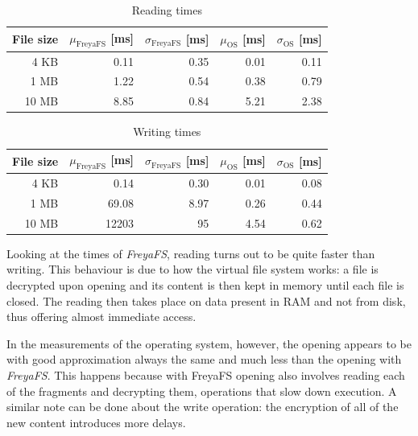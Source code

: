 \documentclass[a4paper,12pt,twoside,openright]{report}
\begin{document}
  \begin{table}[h!]
    \centering
    \begin{tabular}{|r||r|r||r|r|} 
      \hline
      File size & $\mu_\text{FreyaFS}$ [ms] & $\sigma_\text{FreyaFS}$ [ms] & $\mu_\text{OS}$ [ms] & $\sigma_\text{OS}$ [ms] \\ [0.5ex]
      \hline\hline
      4 KB & 0.11 & 0.35   & 0.01 & 0.11 \\
      \hline
      1 MB & 1.22 & 0.54   & 0.38 & 0.79 \\
      \hline
      10 MB & 8.85 & 0.84  & 5.21 & 2.38 \\
      \hline
    \end{tabular}
    \caption{Reading times}
    \label{table:t-read}
  \end{table}

  \begin{table}[h!]
    \centering
    \begin{tabular}{|r||r|r||r|r|} 
      \hline
      File size & $\mu_\text{FreyaFS}$ [ms] & $\sigma_\text{FreyaFS}$ [ms] & $\mu_\text{OS}$ [ms] & $\sigma_\text{OS}$ [ms] \\ [0.5ex]
      \hline\hline
      4 KB & 0.14 & 0.30    & 0.01 & 0.08 \\
      \hline
      1 MB & 69.08 & 8.97   & 0.26 & 0.44 \\
      \hline
      10 MB & 12203 & 95    & 4.54 & 0.62 \\
      \hline
    \end{tabular}
    \caption{Writing times}
    \label{table:t-write}
  \end{table}

  Looking at the times of \textit{FreyaFS}, reading turns out to be quite faster than writing.
  This behaviour is due to how the virtual file system works: a file is decrypted upon opening and
  its content is then kept in memory until each file is closed. The reading then takes place on data
  present in RAM and not from disk, thus offering almost immediate access.

  In the measurements of the operating system, however, the opening appears to be with good approximation
  always the same and much less than the opening with \textit{FreyaFS}.
  This happens because with FreyaFS opening also involves reading each of the fragments and
  decrypting them, operations that slow down execution.
  A similar note can be done about the write operation: the encryption of all of the new content
  introduces more delays.
\end{document}
